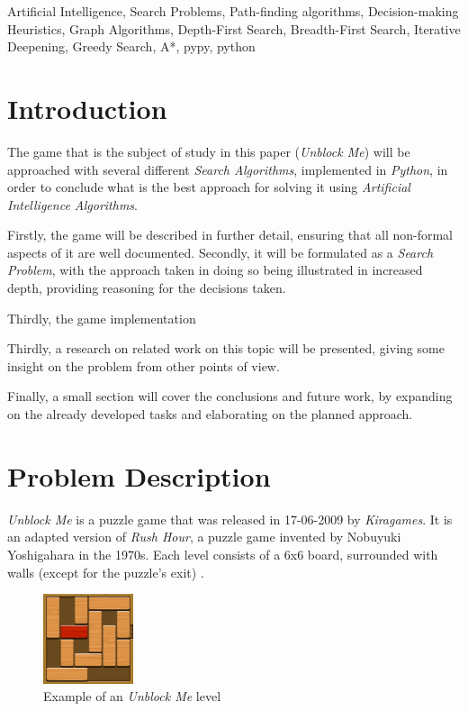 \documentclass[conference]{IEEEtran}
\begin{document}
\begin{IEEEkeywords}
Artificial Intelligence, Search Problems, Path-finding algorithms, Decision-making Heuristics, Graph Algorithms, Depth-First Search, Breadth-First Search, Iterative Deepening, Greedy Search, A*, pypy, python
\end{IEEEkeywords}

\section{Introduction}
The game that is the subject of study in this paper (\textit{Unblock Me}) will be approached with several different \textit{Search Algorithms}, implemented in \textit{Python}, in order to conclude what is the best approach for solving it using \textit{Artificial Intelligence Algorithms}.

Firstly, the game will be described in further detail, ensuring that all non-formal aspects of it are well documented. Secondly, it will be formulated as a \textit{Search Problem}, with the approach taken in doing so being illustrated in increased depth, providing reasoning for the decisions taken.

Thirdly, the game implementation

Thirdly, a research on related work on this topic will be presented, giving some insight on the problem from other points of view.

Finally, a small section will cover the conclusions and future work, by expanding on the already developed tasks and elaborating on the planned approach.

\section{Problem Description}
\textit{Unblock Me} is a puzzle game that was released in 17-06-2009 by \textit{Kiragames}. It is an adapted version of \textit{Rush Hour}, a puzzle game invented by Nobuyuki Yoshigahara in the 1970s. Each level consists of a 6x6 board, surrounded with walls (except for the puzzle's exit) \cite{b1}.

\begin{figure}[H]
    \centerline{\includegraphics[width=100px]{img1.png}}
    \caption{Example of an \textit{Unblock Me} level}
\end{figure}
\end{document}
